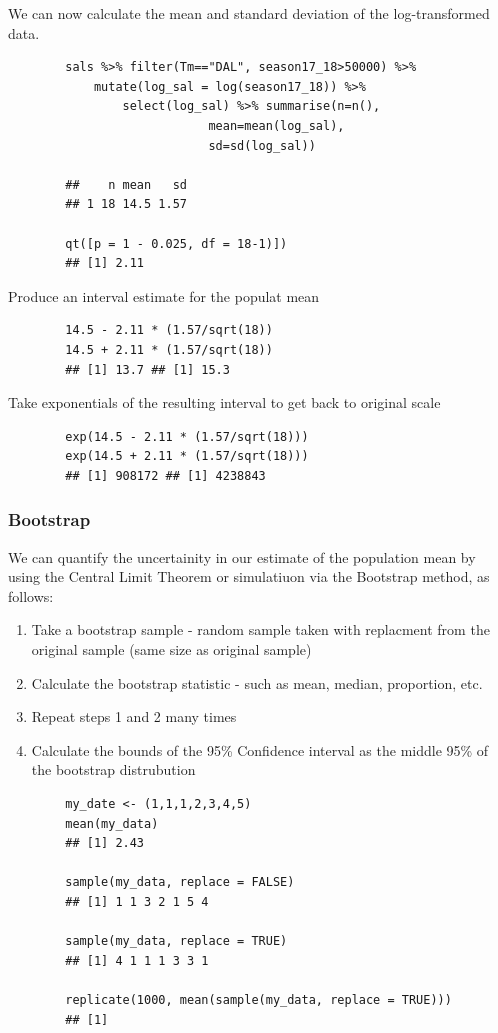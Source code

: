 \documentclass[a4paper, 10pt]{article}
\begin{document}
\begin{examplebox}
    We can now calculate the mean and standard deviation of the log-transformed data.
    \begin{lstlisting}
        sals %>% filter(Tm=="DAL", season17_18>50000) %>% 
            mutate(log_sal = log(season17_18)) %>% 
                select(log_sal) %>% summarise(n=n(),
                            mean=mean(log_sal),
                            sd=sd(log_sal))

        ##    n mean   sd
        ## 1 18 14.5 1.57

        qt([p = 1 - 0.025, df = 18-1)])
        ## [1] 2.11
    \end{lstlisting}
    Produce an interval estimate for the populat mean
    \begin{lstlisting}
        14.5 - 2.11 * (1.57/sqrt(18))
        14.5 + 2.11 * (1.57/sqrt(18))
        ## [1] 13.7 ## [1] 15.3 
    \end{lstlisting}
    Take exponentials of the resulting interval to get back to original scale
    \begin{lstlisting}
        exp(14.5 - 2.11 * (1.57/sqrt(18)))
        exp(14.5 + 2.11 * (1.57/sqrt(18)))
        ## [1] 908172 ## [1] 4238843
    \end{lstlisting}
\end{examplebox}

\subsubsection{Bootstrap}
We can quantify the uncertainity in our estimate of the population mean by using the Central Limit Theorem or simulatiuon via the Bootstrap method, as follows:
\begin{enumerate}
    \item Take a bootstrap  sample - random sample taken with replacment from the original sample (same size as original sample)
    \item Calculate the bootstrap statistic - such as mean, median, proportion, etc.
    \item Repeat steps 1 and 2 many times
    \item Calculate the bounds of the 95\% Confidence interval as the middle 95\% of the bootstrap distrubution
\end{enumerate}

\begin{examplebox}
    \begin{lstlisting}
        my_date <- (1,1,1,2,3,4,5)
        mean(my_data)
        ## [1] 2.43

        sample(my_data, replace = FALSE)
        ## [1] 1 1 3 2 1 5 4

        sample(my_data, replace = TRUE)
        ## [1] 4 1 1 1 3 3 1

        replicate(1000, mean(sample(my_data, replace = TRUE)))
        ## [1]

    \end{lstlisting}
\end{examplebox}
\end{document}
